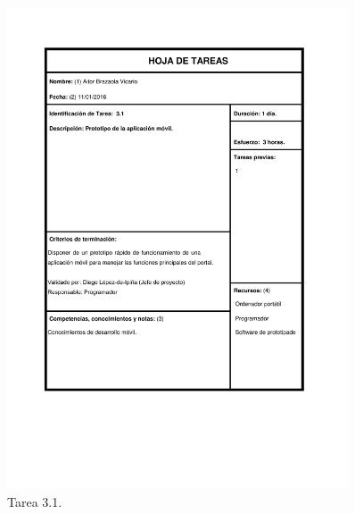 \documentclass{DeustoFDP}
\begin{document}
\begin{figure}[H]
	\centering
	\includegraphics[width=0.9\textwidth]{fig/Tareas/31}
	\caption{Tarea 3.1.}
	\label{fig:t31}
\end{figure}
\end{document}
